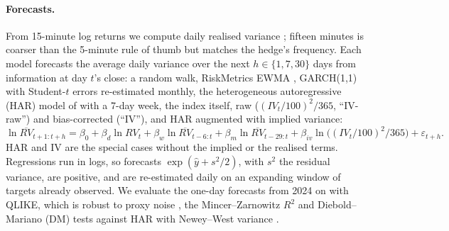 \documentclass[10pt,a4paper]{article}
\newcommand{\IV}{\mathit{IV}}
\newcommand{\RV}{\mathit{RV}}
\begin{document}
\paragraph{Forecasts.} From 15-minute log returns we compute daily realised variance \citep{andersen2003modeling}; fifteen minutes is coarser than the 5-minute rule of thumb \citep{liu2015does} but matches the hedge's frequency. Each model forecasts the average daily variance over the next $h\in\{1,7,30\}$ days from information at day $t$'s close: a random walk, RiskMetrics EWMA \citep{jpmorgan1996riskmetrics}, GARCH(1,1) with Student-$t$ errors \citep{bollerslev1986generalized,bollerslev1987conditionally} re-estimated monthly, the heterogeneous autoregressive (HAR) model of \citet{corsi2009simple} with a 7-day week, the index itself, raw ($(\IV_t/100)^2/365$, ``IV-raw'') and bias-corrected (``IV''), and HAR augmented with implied variance:
\begin{equation}\label{eq:har}
\ln\overline{\RV}_{t+1:t+h}=\beta_0+\beta_d\ln\RV_t+\beta_w\ln\overline{\RV}_{t-6:t}+\beta_m\ln\overline{\RV}_{t-29:t}+\beta_{iv}\ln\big((\IV_t/100)^2/365\big)+\varepsilon_{t+h}.
\end{equation}
HAR and IV are the special cases without the implied or the realised terms. Regressions run in logs, so forecasts $\exp(\hat y+s^2/2)$, with $s^2$ the residual variance, are positive, and are re-estimated daily on an expanding window of targets already observed. We evaluate the \LiveForecastN{} one-day forecasts from 2024 on with QLIKE, which is robust to proxy noise \citep{patton2011volatility}, the Mincer--Zarnowitz $R^2$ and Diebold--Mariano (DM) tests against HAR with Newey--West variance \citep{mincer1969evaluation,diebold1995comparing,newey1987simple}.

\begin{table}[t]
\centering\small

\caption{Live out-of-sample forecast accuracy, 2024 to October 2026. QL ratio: a model's QLIKE over HAR's (best in bold). DM $t$: Diebold--Mariano statistic against HAR (negative favours the model).}
\label{tab:liveforecast}
\end{table}
\end{document}
